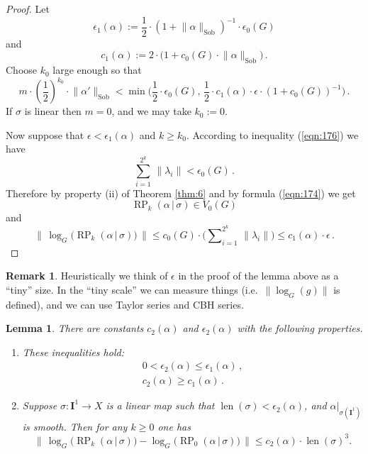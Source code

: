 \documentclass[10pt, a4paper]{amsart}
\newtheorem{lem}[equation]{Lemma}
\theoremstyle{definition}
\newtheorem{rem}[equation]{Remark}
\numberwithin{equation}{section}
\newcommand{\opn}{\operatorname}
\newcommand{\rmitem}[1]{\item[\text{\textup{(#1)}}]}
\newcommand{\mbf}[1]{\mathbf{#1}}
\newcommand{\mrm}[1]{\mathrm{#1}}
\newcommand{\smfrac}[2]{{\textstyle \frac{#1}{#2}}}
\newcommand{\bosum}{\sum\nolimits}
\newcommand{\norm}[1]{\lVert #1 \rVert}
\newcommand{\Norm}[1]{\bigl\lVert\, #1 \, \bigr\rVert}
\renewcommand{\vert}{\, | \,}
\begin{document}
\begin{proof}
Let
\[ \epsilon_1(\alpha) := \smfrac{1}{2} \cdot 
(1 + \norm{ \alpha }_{\mrm{Sob}})^{-1} \cdot \epsilon_0(G) \]
and
\[ c_1(\alpha) := 2 \cdot \bigl( 1 + c_0(G) \cdot \norm{ \alpha }_{\mrm{Sob}}
\bigr) \, . \]
Choose $k_0$ large enough so that 
\[ m \cdot (\smfrac{1}{2})^{k_0} \cdot \norm{ \alpha' }_{\mrm{Sob}} < 
\min \bigl( \smfrac{1}{2} \cdot \epsilon_0(G), \,
\smfrac{1}{2} \cdot c_1(\alpha) \cdot \epsilon \cdot 
(1 + c_0(G))^{-1} \bigr) \, . \]
If $\sigma$ is linear then $m = 0$, and we may take $k_0 := 0$.

Now suppose that $\epsilon < \epsilon_1(\alpha)$ and $k \geq k_0$.
According to inequality (\ref{eqn:176}) we have
\[ \sum_{i = 1}^{2^k} \, \norm{ \lambda_i } < \epsilon_0(G) \, . \]
Therefore by property (ii) of Theorem \ref{thm:6} and by formula
(\ref{eqn:174}) we get
\[ \opn{RP}_{k}(\alpha \vert \sigma) \in V_0(G)  \]
and 
\[ \norm{\, \opn{log}_G \bigl( 
\opn{RP}_{k}(\alpha \vert \sigma) \bigr) \, }
\leq c_0(G) \cdot \bigl( \bosum_{i = 1}^{2^k} \, \norm{ \lambda_i } \bigr)
\leq c_1(\alpha) \cdot \epsilon \, . \]
\end{proof}

\begin{rem} \label{rem:3}
Heuristically we think of $\epsilon$ in the proof of the lemma above as a
``tiny'' size. In the ``tiny scale'' we can measure things (i.e.\ 
$\norm{\log_G(g)}$ is defined), and we can use Taylor series and CBH series. 
\end{rem}

\begin{lem} \label{lem:30}
There are constants $c_2(\alpha)$ and $\epsilon_2(\alpha)$ with the
following properties.
\begin{enumerate}
\rmitem{i} These inequalities hold:
\begin{gather*}
0 < \epsilon_2(\alpha) \leq \epsilon_1(\alpha)  \, , \\
c_2(\alpha) \geq c_1(\alpha) \,  .
\end{gather*}

\rmitem{ii} Suppose $\sigma : \mbf{I}^{1} \to X$ is a linear map
such that $\opn{len}(\sigma) < \epsilon_2(\alpha)$, and 
$\alpha|_{\sigma(\mbf{I}^{1})}$ is smooth.
Then for any $k \geq 0$ one has 
\[ \Norm{ 
\opn{log}_G \bigl( \opn{RP}_{k}(\alpha \vert \sigma) \bigr) -
\opn{log}_G \bigl( \opn{RP}_{0}(\alpha \vert \sigma) \bigr) }
\leq c_2(\alpha) \cdot \opn{len}(\sigma)^3 . \]
\end{enumerate}
\end{lem}
\end{document}
